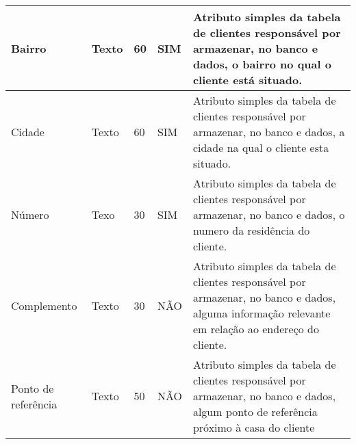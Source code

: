\begin{enumerate}[label=RN\arabic*]
\begin{table}[htb]
\begin{tabular}{|p{3.0cm}|p{2.0cm}|p{1.5cm}|p{2.0cm}|p{5.75cm}|}
			Bairro              & Texto         & 60               & SIM                  & Atributo simples da tabela de clientes responsável por armazenar, no banco e dados, o bairro no qual o cliente está situado.                       \\ \hline
			Cidade              & Texto         & 60               & SIM                  & Atributo simples da tabela de clientes responsável por armazenar, no banco e dados, a cidade na qual o cliente esta situado.                       \\ \hline
			Número              & Texo          & 30               & SIM                  & Atributo simples da tabela de clientes responsável por armazenar, no banco e dados, o numero da residência do cliente.                             \\ \hline
			Complemento         & Texto         & 30               & NÃO                  & Atributo simples da tabela de clientes responsável por armazenar, no banco e dados, alguma informação relevante em relação ao endereço do cliente. \\ \hline
			Ponto de referência & Texto         & 50               & NÃO                  & Atributo simples da tabela de clientes responsável por armazenar, no banco e dados, algum ponto de referência próximo à casa do cliente            \\ \hline
		\end{tabular}
	\end{table}
\end{enumerate}